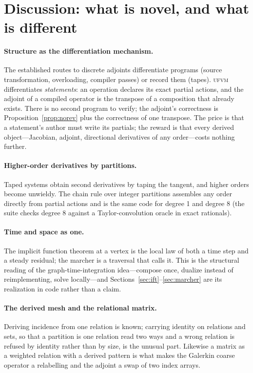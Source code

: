 \documentclass[11pt,a4paper]{article}
\newcommand{\ufvm}{\textsc{ufvm}}
\begin{document}
\section{Discussion: what is novel, and what is different}\label{sec:discussion}

\paragraph{Structure as the differentiation mechanism.} The established routes to discrete adjoints differentiate programs (source transformation, overloading, compiler passes) or record them (tapes). \ufvm{} differentiates \emph{statements}: an operation declares its exact partial actions, and the adjoint of a compiled operator is the transpose of a composition that already exists. There is no second program to verify; the adjoint's correctness is Proposition~\ref{prop:norev} plus the correctness of one transpose. The price is that a statement's author must write its partials; the reward is that every derived object---Jacobian, adjoint, directional derivatives of any order---costs nothing further.

\paragraph{Higher-order derivatives by partitions.} Taped systems obtain second derivatives by taping the tangent, and higher orders become unwieldy. The chain rule over integer partitions assembles any order directly from partial actions and is the same code for degree 1 and degree 8 (the suite checks degree 8 against a Taylor-convolution oracle in exact rationals).

\paragraph{Time and space as one.} The implicit function theorem at a vertex is the local law of both a time step and a steady residual; the marcher is a traversal that calls it. This is the structural reading of the graph-time-integration idea---compose once, dualize instead of reimplementing, solve locally---and Sections~\ref{sec:ift}--\ref{sec:marcher} are its realization in code rather than a claim.

\paragraph{The derived mesh and the relational matrix.} Deriving incidence from one relation is known; carrying identity on relations and sets, so that a partition is one relation read two ways and a wrong relation is refused by identity rather than by size, is the unusual part. Likewise a matrix as a weighted relation with a derived pattern is what makes the Galerkin coarse operator a relabelling and the adjoint a swap of two index arrays.
\end{document}
